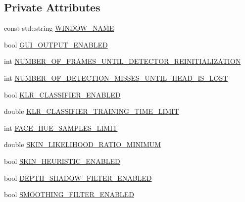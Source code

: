 \subsection*{\-Private \-Attributes}
\begin{DoxyCompactItemize}
\item 
const std\-::string \hyperlink{class_r_p_head_tracking_node_a55c8d0690666fd8ed95b0b8352cca591}{\-W\-I\-N\-D\-O\-W\-\_\-\-N\-A\-M\-E}
\item 
bool \hyperlink{class_r_p_head_tracking_node_ae62a4e592ca4c05f2cd232ca745ad5ba}{\-G\-U\-I\-\_\-\-O\-U\-T\-P\-U\-T\-\_\-\-E\-N\-A\-B\-L\-E\-D}
\item 
int \hyperlink{class_r_p_head_tracking_node_a23eeb6a7ede14f9e47535ef7d6a435b0}{\-N\-U\-M\-B\-E\-R\-\_\-\-O\-F\-\_\-\-F\-R\-A\-M\-E\-S\-\_\-\-U\-N\-T\-I\-L\-\_\-\-D\-E\-T\-E\-C\-T\-O\-R\-\_\-\-R\-E\-I\-N\-I\-T\-I\-A\-L\-I\-Z\-A\-T\-I\-O\-N}
\item 
int \hyperlink{class_r_p_head_tracking_node_ad14b7ec4ecf2cb62091289fb530946be}{\-N\-U\-M\-B\-E\-R\-\_\-\-O\-F\-\_\-\-D\-E\-T\-E\-C\-T\-I\-O\-N\-\_\-\-M\-I\-S\-S\-E\-S\-\_\-\-U\-N\-T\-I\-L\-\_\-\-H\-E\-A\-D\-\_\-\-I\-S\-\_\-\-L\-O\-S\-T}
\item 
bool \hyperlink{class_r_p_head_tracking_node_ad53c9b618a197510b7065d3b9b28dcb1}{\-K\-L\-R\-\_\-\-C\-L\-A\-S\-S\-I\-F\-I\-E\-R\-\_\-\-E\-N\-A\-B\-L\-E\-D}
\item 
double \hyperlink{class_r_p_head_tracking_node_a049bad2b64bbfc0cb43b6a913c5e6617}{\-K\-L\-R\-\_\-\-C\-L\-A\-S\-S\-I\-F\-I\-E\-R\-\_\-\-T\-R\-A\-I\-N\-I\-N\-G\-\_\-\-T\-I\-M\-E\-\_\-\-L\-I\-M\-I\-T}
\item 
int \hyperlink{class_r_p_head_tracking_node_a8834e8b4fe75aa2908fd79e4021b0573}{\-F\-A\-C\-E\-\_\-\-H\-U\-E\-\_\-\-S\-A\-M\-P\-L\-E\-S\-\_\-\-L\-I\-M\-I\-T}
\item 
double \hyperlink{class_r_p_head_tracking_node_a9dda8ff66eca7d0622a438b6c3b77fe9}{\-S\-K\-I\-N\-\_\-\-L\-I\-K\-E\-L\-I\-H\-O\-O\-D\-\_\-\-R\-A\-T\-I\-O\-\_\-\-M\-I\-N\-I\-M\-U\-M}
\item 
bool \hyperlink{class_r_p_head_tracking_node_a164b614083d44aac085c856674170506}{\-S\-K\-I\-N\-\_\-\-H\-E\-U\-R\-I\-S\-T\-I\-C\-\_\-\-E\-N\-A\-B\-L\-E\-D}
\item 
bool \hyperlink{class_r_p_head_tracking_node_a70c083e7ca08af282d686198bd16a884}{\-D\-E\-P\-T\-H\-\_\-\-S\-H\-A\-D\-O\-W\-\_\-\-F\-I\-L\-T\-E\-R\-\_\-\-E\-N\-A\-B\-L\-E\-D}
\item 
bool \hyperlink{class_r_p_head_tracking_node_acd8f3bddcd0db71ecda21f4b5a1858ee}{\-S\-M\-O\-O\-T\-H\-I\-N\-G\-\_\-\-F\-I\-L\-T\-E\-R\-\_\-\-E\-N\-A\-B\-L\-E\-D}

\end{DoxyCompactItemize}
